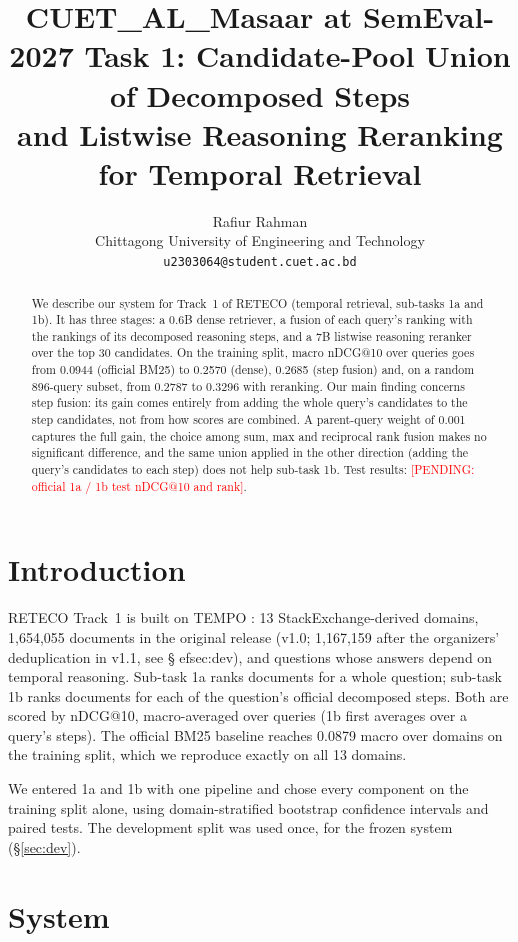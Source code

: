 \documentclass[11pt]{article}
\title{CUET\_AL\_Masaar at SemEval-2027 Task 1: Candidate-Pool Union of Decomposed Steps\\
and Listwise Reasoning Reranking for Temporal Retrieval}
\author{Rafiur Rahman \\
  Chittagong University of Engineering and Technology \\
  \texttt{u2303064@student.cuet.ac.bd}}
\newcommand{\pending}[1]{\textcolor{red}{[PENDING: #1]}}
\begin{document}
\maketitle

\begin{abstract}
We describe our system for Track~1 of RETECO (temporal retrieval, sub-tasks 1a and 1b). It has
three stages: a 0.6B dense retriever, a fusion of each query's ranking with the rankings of its
decomposed reasoning steps, and a 7B listwise reasoning reranker over the top 30 candidates.
On the training split, macro nDCG@10 over queries goes from 0.0944 (official BM25) to 0.2570
(dense), 0.2685 (step fusion) and, on a random 896-query subset, from 0.2787 to 0.3296 with
reranking. Our main finding concerns step fusion: its gain comes entirely from adding the whole
query's candidates to the step candidates, not from how scores are combined. A parent-query
weight of 0.001 captures the full gain, the choice among sum, max and reciprocal rank fusion
makes no significant difference, and the same union applied in the other direction (adding
the query's candidates to each step) does not help sub-task 1b.
Test results: \pending{official 1a / 1b test nDCG@10 and rank}.
\end{abstract}

\section{Introduction}
RETECO Track~1 is built on TEMPO \citep{abdallah2026tempo}: 13 StackExchange-derived domains,
1,654,055 documents in the original release (v1.0; 1,167,159 after the organizers' deduplication in v1.1, see \S
ef{sec:dev}), and questions whose answers depend on temporal reasoning. Sub-task 1a ranks
documents for a whole question; sub-task 1b ranks documents for each of the question's official
decomposed steps. Both are scored by nDCG@10, macro-averaged over queries (1b first averages over
a query's steps). The official BM25 baseline reaches 0.0879 macro over domains on the training
split, which we reproduce exactly on all 13 domains.

We entered 1a and 1b with one pipeline and chose every component on the training split alone,
using domain-stratified bootstrap confidence intervals and paired tests. The development split
was used once, for the frozen system (\S\ref{sec:dev}).

\section{System}
\end{document}
